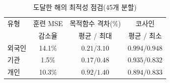 \begin{table}[htbp]
  \caption{도달한 해의 최적성 점검(45개 분할)}
  \label{tab:convergence}
  \small
  \centering
  \begin{tabular}{@{}lccc@{}}
    \toprule
    유형 & 훈련 MSE & 목적함수 격차(\%) & 코사인 \\
     & 감소율 & 평균 / 최대 & 평균 / 최소 \\
    \midrule
    외국인 & 14.1\% & $0.21/3.10$ & $0.994/0.948$ \\
    기관   & 1.5\%  & $0.17/0.48$ & $0.935/0.832$ \\
    개인   & 10.3\% & $0.92/1.40$ & $0.894/0.833$ \\
    \bottomrule
  \end{tabular}
\end{table}
